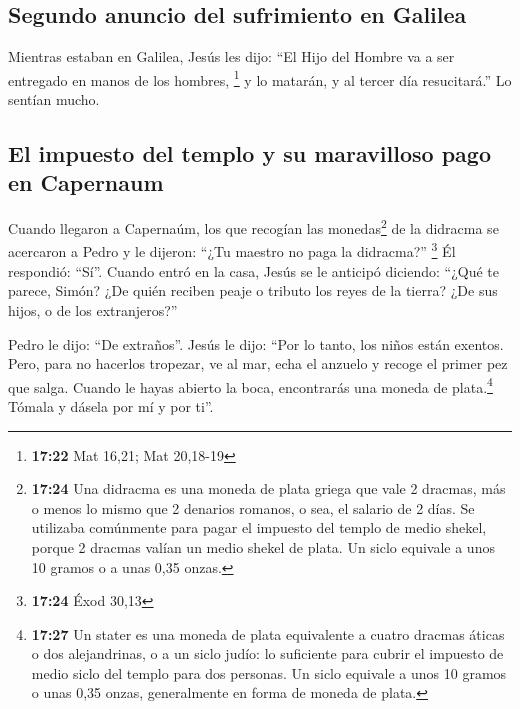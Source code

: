 \begin{paracol}{2}
\hypertarget{segundo-anuncio-del-sufrimiento-en-galilea}{%
\subsection{Segundo anuncio del sufrimiento en
Galilea}\label{segundo-anuncio-del-sufrimiento-en-galilea}}

 Mientras estaban en Galilea, Jesús les dijo: ``El Hijo
del Hombre va a ser entregado en manos de los hombres, \footnote{\textbf{17:22}
  Mat 16,21; Mat 20,18-19}  y lo matarán, y al tercer día
resucitará.'' Lo sentían mucho.

\hypertarget{el-impuesto-del-templo-y-su-maravilloso-pago-en-capernaum}{%
\subsection{El impuesto del templo y su maravilloso pago en
Capernaum}\label{el-impuesto-del-templo-y-su-maravilloso-pago-en-capernaum}}

 Cuando llegaron a Capernaúm, los que recogían las
monedas\footnote{\textbf{17:24} Una didracma es una moneda de plata
  griega que vale 2 dracmas, más o menos lo mismo que 2 denarios
  romanos, o sea, el salario de 2 días. Se utilizaba comúnmente para
  pagar el impuesto del templo de medio shekel, porque 2 dracmas valían
  un medio shekel de plata. Un siclo equivale a unos 10 gramos o a unas
  0,35 onzas.} de la didracma se acercaron a Pedro y le dijeron: ``¿Tu
maestro no paga la didracma?'' \footnote{\textbf{17:24} Éxod 30,13}
 Él respondió: ``Sí''. Cuando entró en la casa, Jesús se
le anticipó diciendo: ``¿Qué te parece, Simón? ¿De quién reciben peaje o
tributo los reyes de la tierra? ¿De sus hijos, o de los extranjeros?''

 Pedro le dijo: ``De extraños''. Jesús le dijo: ``Por lo
tanto, los niños están exentos.  Pero, para no hacerlos
tropezar, ve al mar, echa el anzuelo y recoge el primer pez que salga.
Cuando le hayas abierto la boca, encontrarás una moneda de
plata.\footnote{\textbf{17:27} Un stater es una moneda de plata
  equivalente a cuatro dracmas áticas o dos alejandrinas, o a un siclo
  judío: lo suficiente para cubrir el impuesto de medio siclo del templo
  para dos personas. Un siclo equivale a unos 10 gramos o unas 0,35
  onzas, generalmente en forma de moneda de plata.} Tómala y dásela por
mí y por ti''.

\switchcolumn
\begin{otherlanguage}{english}


\end{otherlanguage}
\end{paracol}
